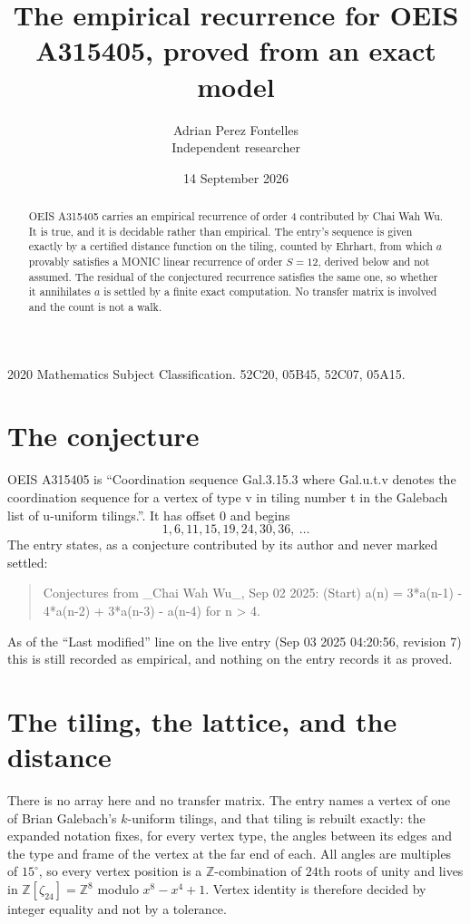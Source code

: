 \documentclass[11pt,a4paper]{article}
\title{The empirical recurrence for OEIS A315405, proved from an exact model}
\author{Adrian Perez Fontelles\\ \small Independent researcher}
\date{14 September 2026}
\theoremstyle{plain}
\theoremstyle{definition}
\begin{document}
\maketitle

\begin{abstract}
OEIS A315405 carries an empirical recurrence of order $4$ contributed by Chai Wah Wu. It is true, and it is
decidable rather than empirical. The entry's sequence is given exactly by a certified distance function on the tiling, counted by Ehrhart, from
which $a$ provably satisfies a MONIC linear recurrence of order $S=12$, derived below and not
assumed. The residual of the conjectured recurrence satisfies the same one, so whether it
annihilates $a$ is settled by a finite exact computation. No transfer matrix is involved and the count is not a walk.
\end{abstract}

\noindent\small 2020 Mathematics Subject Classification. 52C20, 05B45, 52C07, 05A15.\normalsize

\section{The conjecture}

OEIS A315405 is ``Coordination sequence Gal.3.15.3 where Gal.u.t.v denotes the coordination sequence for a vertex of type v in tiling number t in the Galebach list of u-uniform tilings.''. It has offset $0$ and begins
\[
1, 6, 11, 15, 19, 24, 30, 36,\ \dots
\]
The entry states, as a conjecture contributed by its author and never marked settled:
\begin{quote}
Conjectures from \_Chai Wah Wu\_, Sep 02 2025: (Start) a(n) = 3*a(n-1) - 4*a(n-2) + 3*a(n-3) - a(n-4) for n > 4.
\end{quote}
As of the ``Last modified'' line on the live entry (Sep 03 2025 04:20:56, revision 7)
this is still recorded as empirical, and nothing on the entry records it as proved.

\section{The tiling, the lattice, and the distance}

There is no array here and no transfer matrix. The entry names a vertex of one of Brian
Galebach's $k$-uniform tilings, and that tiling is rebuilt exactly: the expanded notation
fixes, for every vertex type, the angles between its edges and the type and frame of the
vertex at the far end of each. All angles are multiples of $15^\circ$, so every vertex
position is a $\mathbb{Z}$-combination of $24$th roots of unity and lives in
$\mathbb{Z}[\zeta_{24}]=\mathbb{Z}^{8}$ modulo $x^{8}-x^{4}+1$. Vertex identity is
therefore decided by integer equality and not by a tolerance.
\end{document}
